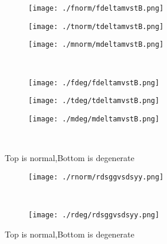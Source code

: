 \documentclass[aps,floats,floatfix,nofootinbib]{revtex4-1}
\begin{document}
\begin{center}
\begin{figure}
\begin{subfigure}{0.3\textwidth}
\texttt{[image: ./fnorm/fdeltamvstB.png]}
\label{}
\end{subfigure}
\begin{subfigure}{0.3\textwidth}
\texttt{[image: ./tnorm/tdeltamvstB.png]}
\label{}
\end{subfigure}
\begin{subfigure}{0.3\textwidth}
\texttt{[image: ./mnorm/mdeltamvstB.png]}
\label{}
\end{subfigure}\\
\begin{subfigure}{0.3\textwidth}
\texttt{[image: ./fdeg/fdeltamvstB.png]}
\label{}
\end{subfigure}
\begin{subfigure}{0.3\textwidth}
\texttt{[image: ./tdeg/tdeltamvstB.png]}
\label{}
\end{subfigure}
\begin{subfigure}{0.3\textwidth}
\texttt{[image: ./mdeg/mdeltamvstB.png]}
\label{}
\end{subfigure}\\
\caption{Top is normal,Bottom is degenerate}
\end{figure}
\end{center}

\begin{center}
\begin{figure}
\begin{subfigure}{0.95\textwidth}
\texttt{[image: ./rnorm/rdsggvsdsyy.png]}
\label{}
\end{subfigure}\\
\begin{subfigure}{0.95\textwidth}
\texttt{[image: ./rdeg/rdsggvsdsyy.png]}
\label{}
\end{subfigure}
\caption{Top is normal,Bottom is degenerate}
\end{figure}
\end{center}
\end{document}
